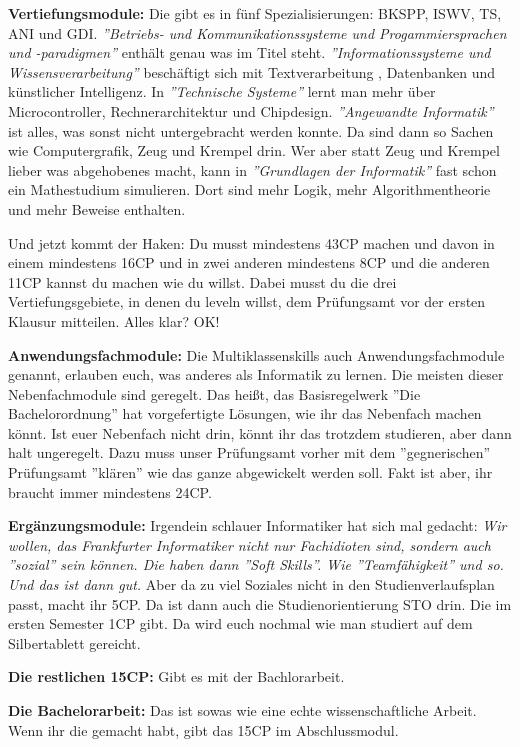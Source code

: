 \textbf{Vertiefungsmodule:}
Die gibt es in f\"unf Spezialisierungen: BKSPP, ISWV, TS, ANI und GDI. \emph{''Betriebs-
und Kommunikationssysteme und Progammiersprachen und -paradigmen''} enth\"alt
genau was im Titel steht. \emph{''Informationssysteme und Wissensverarbeitung''}
besch\"aftigt sich mit Textverarbeitung , Datenbanken und k\"unstlicher
Intelligenz. In \emph{''Technische Systeme''} lernt man mehr \"uber Microcontroller,
Rechnerarchitektur und Chipdesign. \emph{''Angewandte Informatik''} ist alles, was
sonst nicht untergebracht werden konnte. Da sind dann so Sachen wie
Computergrafik, Zeug und Krempel drin. Wer aber statt Zeug und Krempel lieber
was abgehobenes macht, kann in \emph{''Grundlagen der Informatik''} fast schon ein
Mathestudium simulieren. Dort sind mehr Logik, mehr Algorithmentheorie und mehr
Beweise enthalten.

Und jetzt kommt der Haken: Du musst mindestens 43CP machen und davon in einem
mindestens 16CP und in zwei anderen mindestens 8CP und die anderen 11CP kannst
du machen wie du willst. Dabei musst du die drei Vertiefungsgebiete, in denen
du leveln willst, dem Pr\"ufungsamt vor der ersten Klausur mitteilen. Alles
klar? OK!

\textbf{Anwendungsfachmodule:}
Die Multiklassenskills auch Anwendungsfachmodule genannt, erlauben euch, was anderes als Informatik zu lernen.
Die meisten dieser Nebenfachmodule sind geregelt. Das hei{\ss}t, das
Basisregelwerk ''Die Bachelorordnung'' hat vorgefertigte L\"osungen, wie ihr das
Nebenfach machen k\"onnt. Ist euer Nebenfach nicht drin, k\"onnt ihr das trotzdem studieren, aber dann halt ungeregelt.
Dazu muss unser Pr\"ufungsamt vorher mit dem ''gegnerischen'' Pr\"ufungsamt ''kl\"aren'' wie das ganze abgewickelt werden soll.
Fakt ist aber, ihr braucht immer mindestens 24CP.

\textbf{Erg\"anzungsmodule:}
Irgendein schlauer Informatiker hat sich mal gedacht: \emph{Wir wollen, das
Frankfurter Informatiker nicht nur Fachidioten sind, sondern auch ''sozial''
sein k\"onnen. Die haben dann ''Soft Skills''. Wie ''Teamf\"ahigkeit'' und so. Und das
ist dann gut.} Aber da zu viel Soziales nicht in den Studienverlaufsplan passt, macht ihr 5CP.
Da ist dann auch die Studienorientierung STO drin. Die im ersten Semester 1CP gibt.
Da wird euch nochmal wie man studiert auf dem Silbertablett gereicht.

\textbf{Die restlichen 15CP:}
Gibt es mit der Bachlorarbeit.

\textbf{Die Bachelorarbeit:}
Das ist sowas wie eine echte wissenschaftliche Arbeit. Wenn ihr die gemacht habt, gibt das 15CP im Abschlussmodul.


